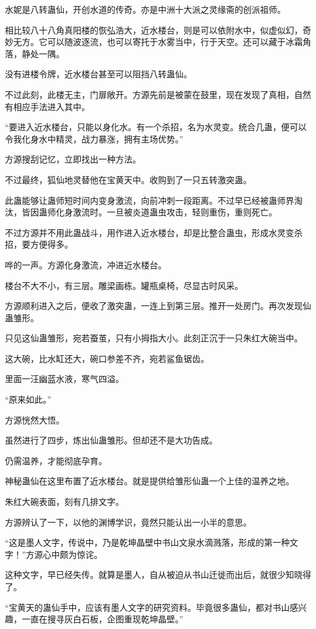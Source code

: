 \begin{this_body}
水妮是八转蛊仙，开创水道的传奇。亦是中洲十大派之灵缘斋的创派祖师。

相比较八十八角真阳楼的恢弘浩大，近水楼台，则是可以依附水中，似虚似幻，奇妙无方。它可以随波逐流，也可以寄托于水雾当中，行于天空。还可以藏于冰霜角落，静处一隅。

没有进楼令牌，近水楼台甚至可以阻挡八转蛊仙。

不过此刻，此楼无主，门扉敞开。方源先前是被蒙在鼓里，现在发现了真相，自然有相应手法进入其中。

“要进入近水楼台，只能以身化水。有一个杀招，名为水灵变。统合几蛊，便可以令我化身水中精灵，战力暴涨，拥有主场优势。”

方源搜刮记忆，立即找出一种方法。

不过最终，狐仙地灵替他在宝黄天中。收购到了一只五转激突蛊。

此蛊能够让蛊师短时间内变身激流，向前冲刺一段距离。不过早已经被蛊师界淘汰，皆因蛊师化身激流时。一旦被炎道蛊虫攻击，轻则重伤，重则死亡。

不过方源并不用此蛊战斗，用作进入近水楼台，却是比整合蛊虫，形成水灵变杀招，要方便得多。

哗的一声。方源化身激流，冲进近水楼台。

楼台不大不小，有三层。雕梁画栋。罐瓶桌椅，尽显古时风采。

方源顺利进入之后，便收了激突蛊，一连上到第三层。推开一处房门。再次发现仙蛊雏形。

只见这仙蛊雏形，宛若蚕茧，只有小拇指大小。此刻正沉于一只朱红大碗当中。

这大碗，比水缸还大，碗口参差不齐，宛若鲨鱼锯齿。

里面一汪幽蓝水液，寒气四溢。

“原来如此。”

方源恍然大悟。

虽然进行了四步，炼出仙蛊雏形。但却还不是大功告成。

仍需温养，才能彻底孕育。

神秘蛊仙在这里布置了近水楼台。就是提供给雏形仙蛊一个上佳的温养之地。

朱红大碗表面，刻有几排文字。

方源辨认了一下，以他的渊博学识，竟然只能认出一小半的意思。

“这是墨人文字，传说中，乃是乾坤晶壁中书山文泉水滴溅落，形成的第一种文字！”方源心中颇为惊诧。

这种文字，早已经失传。就算是墨人，自从被迫从书山迁徙而出后，就很少知晓得了。

“宝黄天的蛊仙手中，应该有墨人文字的研究资料。毕竟很多蛊仙，都对书山感兴趣，一直在搜寻灰白石板，企图重现乾坤晶壁。”


\end{this_body}

